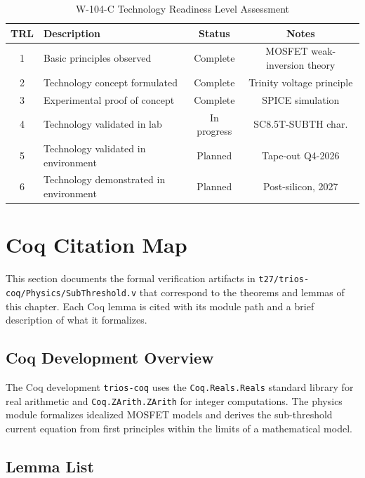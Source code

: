 \begin{table}[htbp]
\centering
\caption{W-104-C Technology Readiness Level Assessment}
\label{tab:trl}
\begin{tabular}{clcc}
\hline
TRL & Description & Status & Notes \\
\hline
1 & Basic principles observed & Complete & MOSFET weak-inversion theory \\
2 & Technology concept formulated & Complete & Trinity voltage principle \\
3 & Experimental proof of concept & Complete & SPICE simulation \\
4 & Technology validated in lab & In progress & SC8.5T-SUBTH char. \\
5 & Technology validated in environment & Planned & Tape-out Q4-2026 \\
6 & Technology demonstrated in environment & Planned & Post-silicon, 2027 \\
\hline
\end{tabular}
\end{table}

\section{Coq Citation Map}
\label{sec:coq_map}

This section documents the formal verification artifacts in
\texttt{t27/trios-coq/Physics/SubThreshold.v} that correspond to the theorems and
lemmas of this chapter.  Each Coq lemma is cited with its module path and a brief
description of what it formalizes.

\subsection{Coq Development Overview}

The Coq development \texttt{trios-coq} uses the \texttt{Coq.Reals.Reals} standard
library for real arithmetic and \texttt{Coq.ZArith.ZArith} for integer computations.
The physics module formalizes idealized MOSFET models and derives the sub-threshold
current equation from first principles within the limits of a mathematical model.

\subsection{Lemma List}


